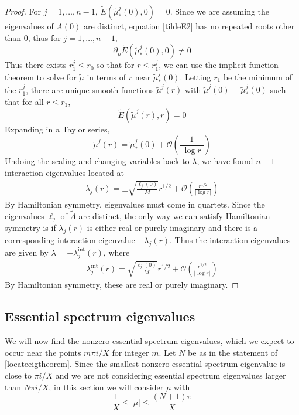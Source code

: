 \documentclass[thesis.tex]{subfiles}
\begin{document}
\begin{lemma}
\begin{proof}
For $j = 1, \dots, n-1$, $\tilde{E}(\tilde{\mu}_*^j(0), 0) = 0$. Since we are assuming the eigenvalues of $\tilde{A}(0)$ are distinct, equation \cref{tildeE2} has no repeated roots other than $0$, thus for $j = 1, \dots, n-1$,
\[
\partial_{\tilde{\mu}} \tilde{E}(\tilde{\mu}_*^j(0), 0) \neq 0
\]
Thus there exists $r_1^j \leq r_0$ so that for $r \leq r_1^j$, we can use the implicit function theorem to solve for $\tilde{\mu}$ in terms of $r$ near $\tilde{\mu}_*^j(0)$. Letting $r_1$ be the minimum of the $r_1^j$, there are unique smooth functions $\tilde{\mu}^j(r)$ with $\tilde{\mu}^j(0) = \tilde{\mu}_*^j(0)$ such that for all $r \leq r_1$,
\[
\tilde{E}(\tilde{\mu}^j(r), r) = 0
\]
Expanding in a Taylor series,
\[
\tilde{\mu}^j(r) = \tilde{\mu}_*^j(0) + \mathcal{O}\left( \frac{1}{|\log r|} \right)
\]
Undoing the scaling and changing variables back to $\lambda$, we have found $n-1$ interaction eigenvalues located at
\begin{align*}
\lambda_j(r) = \pm \sqrt{\frac{\ell_j(0)}{M}} r^{1/2} + \mathcal{O}\left( \frac{r^{1/2}}{|\log r|} \right)
\end{align*}
By Hamiltonian symmetry, eigenvalues must come in quartets. Since the eigenvalues $\ell_j$ of $\tilde{A}$ are distinct, the only way we can satisfy Hamiltonian symmetry is if $\lambda_j(r)$ is either real or purely imaginary and there is a corresponding interaction eigenvalue $-\lambda_j(r)$. Thus the interaction eigenvalues are given by $\lambda = \pm \lambda^{\text{int}}_j(r)$, where
\begin{align*}
\lambda^{\text{int}}_j(r) = \sqrt{\frac{\ell_j(0)}{M}} r^{1/2} + \mathcal{O}\left( \frac{r^{1/2}}{|\log r|} \right)
\end{align*}
By Hamiltonian symmetry, these are real or purely imaginary.
\end{proof}
\end{lemma}

\subsection{Essential spectrum eigenvalues}

We will now find the nonzero essential spectrum eigenvalues, which we expect to occur near the points $m \pi i/X$ for integer $m$. Let $N$ be as in the statement of \cref{locateeigtheorem}. Since the smallest nonzero essential spectrum eigenvalue is close to $\pi i/X$ and we are not considering essential spectrum eigenvalues larger than $N \pi i/X$, in this section we will consider $\mu$ with
\begin{equation}\label{mucondess}
\frac{1}{X} \leq |\mu| \leq \frac{(N+1)\pi}{X}
\end{equation}
\end{document}
